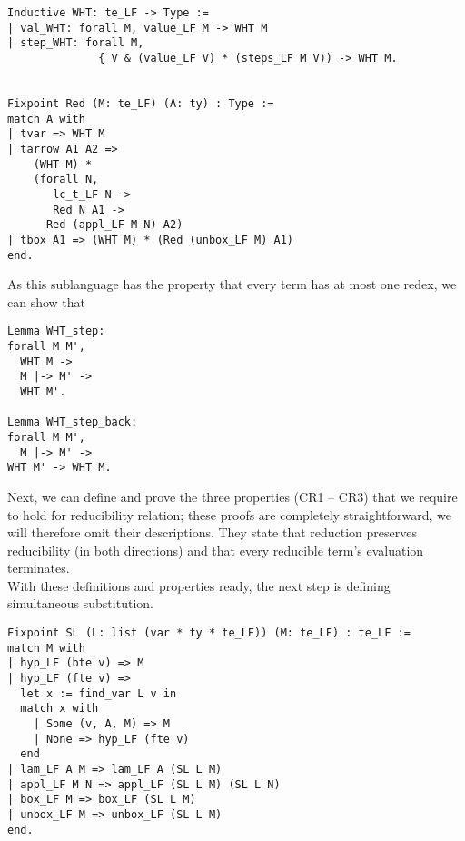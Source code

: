 \begin{verbatim}
Inductive WHT: te_LF -> Type :=
| val_WHT: forall M, value_LF M -> WHT M
| step_WHT: forall M,
              { V & (value_LF V) * (steps_LF M V)) -> WHT M.


Fixpoint Red (M: te_LF) (A: ty) : Type :=
match A with
| tvar => WHT M
| tarrow A1 A2 =>
    (WHT M) *
    (forall N,
       lc_t_LF N ->
       Red N A1 ->
      Red (appl_LF M N) A2)
| tbox A1 => (WHT M) * (Red (unbox_LF M) A1)
end.
\end{verbatim}

As this sublanguage has the property that every term has at most one redex, we can show that

\begin{verbatim}
Lemma WHT_step:
forall M M',
  WHT M ->
  M |-> M' ->
  WHT M'.

Lemma WHT_step_back:
forall M M',
  M |-> M' ->
WHT M' -> WHT M.
\end{verbatim}

Next, we can define and prove the three properties (CR1 -- CR3) that we require to hold for reducibility relation; these proofs are completely straightforward, we will therefore omit their descriptions. They state that reduction preserves reducibility (in both directions) and that every reducible term's evaluation terminates.\\

With these definitions and properties ready, the next step is defining simultaneous substitution.  
\begin{verbatim}
Fixpoint SL (L: list (var * ty * te_LF)) (M: te_LF) : te_LF :=
match M with
| hyp_LF (bte v) => M
| hyp_LF (fte v) =>
  let x := find_var L v in
  match x with
    | Some (v, A, M) => M
    | None => hyp_LF (fte v)
  end
| lam_LF A M => lam_LF A (SL L M)
| appl_LF M N => appl_LF (SL L M) (SL L N)
| box_LF M => box_LF (SL L M)
| unbox_LF M => unbox_LF (SL L M)
end.
\end{verbatim}


